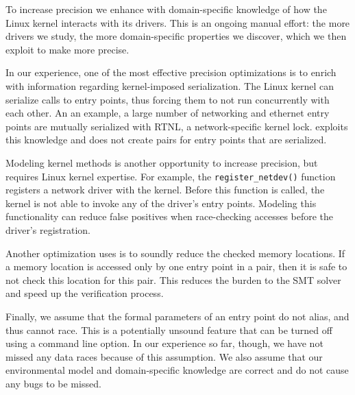 To increase precision we enhance \whoop with domain-specific knowledge of how the Linux kernel interacts with its drivers. This is an ongoing manual effort: the more drivers we study, the more domain-specific properties we discover, which we then exploit to make \whoop more precise.

In our experience, one of the most effective precision optimizations is to enrich \whoop with information regarding kernel-imposed serialization. The Linux kernel can serialize calls to entry points, thus forcing them to not run concurrently with each other. An an example, a large number of networking and ethernet entry points are mutually serialized with RTNL, a network-specific kernel lock. \whoop exploits this knowledge and does not create pairs for entry points that are serialized.

Modeling kernel methods is another opportunity to increase precision, but requires Linux kernel expertise. For example, the \texttt{register\_netdev()} function registers a network driver with the kernel. Before this function is called, the kernel is not able to invoke any of the driver's entry points. Modeling this functionality can reduce false positives when race-checking accesses before the driver's registration.

Another optimization \whoop uses is to soundly reduce the checked memory locations. If a memory location is accessed only by one entry point in a pair, then it is safe to not check this location for this pair. This reduces the burden to the SMT solver and speed up the verification process.


Finally, we assume that the formal parameters of an entry point do not alias, and thus cannot race. This is a potentially unsound feature that can be turned off using a command line option. In our experience so far, though, we have not missed any data races because of this assumption. We also assume that our environmental model and domain-specific knowledge are correct and do not cause any bugs to be missed.

